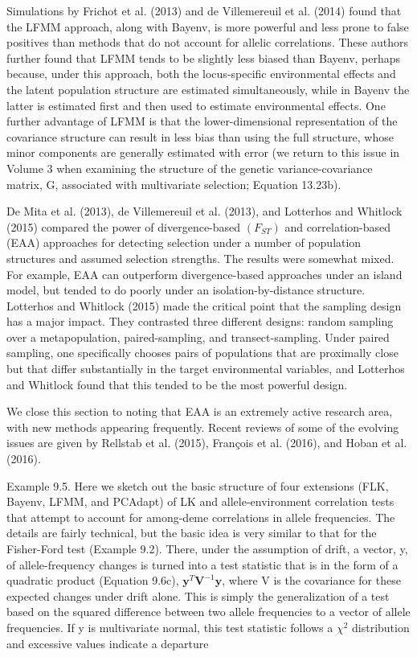 \documentclass{article}
\begin{document}
Simulations by Frichot et al. (2013) and de Villemereuil et al. (2014) found that the LFMM approach, along with Bayenv, is more powerful and less prone to false positives than methods that do not account for allelic correlations. These authors further found that LFMM tends to be slightly less biased than Bayenv, perhaps because, under this approach, both the locus-specific environmental effects and the latent population structure are estimated simultaneously, while in Bayenv the latter is estimated first and then used to estimate environmental effects. One further advantage of LFMM is that the lower-dimensional representation of the covariance structure can result in less bias than using the full structure, whose minor components are generally estimated with error (we return to this issue in Volume 3 when examining the structure of the genetic variance-covariance matrix, G, associated with multivariate selection; Equation 13.23b).

De Mita et al. (2013), de Villemereuil et al. (2013), and Lotterhos and Whitlock (2015) compared the power of divergence-based  $ (F_{ST}) $ and correlation-based (EAA) approaches for detecting selection under a number of population structures and assumed selection strengths. The results were somewhat mixed. For example, EAA can outperform divergence-based approaches under an island model, but tended to do poorly under an isolation-by-distance structure. Lotterhos and Whitlock (2015) made the critical point that the sampling design has a major impact. They contrasted three different designs: random sampling over a metapopulation, paired-sampling, and transect-sampling. Under paired sampling, one specifically chooses pairs of populations that are proximally close but that differ substantially in the target environmental variables, and Lotterhos and Whitlock found that this tended to be the most powerful design.

We close this section to noting that EAA is an extremely active research area, with new methods appearing frequently. Recent reviews of some of the evolving issues are given by Rellstab et al. (2015), François et al. (2016), and Hoban et al. (2016).

Example 9.5. Here we sketch out the basic structure of four extensions (FLK, Bayenv, LFMM, and PCAdapt) of LK and allele-environment correlation tests that attempt to account for among-deme correlations in allele frequencies. The details are fairly technical, but the basic idea is very similar to that for the Fisher-Ford test (Example 9.2). There, under the assumption of drift, a vector, y, of allele-frequency changes is turned into a test statistic that is in the form of a quadratic product (Equation 9.6c),  $ \mathbf{y}^{T}\mathbf{V}^{-1}\mathbf{y} $, where V is the covariance for these expected changes under drift alone. This is simply the generalization of a test based on the squared difference between two allele frequencies to a vector of allele frequencies. If y is multivariate normal, this test statistic follows a  $ \chi^{2} $ distribution and excessive values indicate a departure
\end{document}
